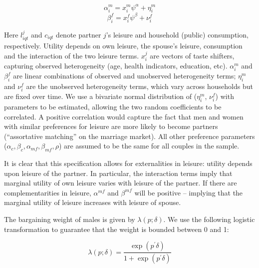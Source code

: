 \documentclass[11pt,letter]{article}
\begin{document}
\begin{equation}\label{mutman}
\alpha_{i}^{m}=x_{i}^{m}\psi^{\alpha}+\eta_{i}^{m}
\end{equation}
\begin{equation}\label{mutwoman}
\beta_{i}^{f}=x_{i}^{f}\psi^{\beta}+\nu_{i}^{f}
\end{equation}



Here $l_{iqt}^{j}$ and $c_{iqt}$ denote partner $j$'s leisure and household (public) consumption, respectively. Utility depends on own leisure, the spouse's leisure, consumption and the interaction of the two leisure terms. $x_{i}^{j}$ are vectors of taste shifters, capturing observed heterogeneity (age, health indicators, education, etc). $\alpha_{i}^{m}$ and $\beta_{i}^{f}$ are linear combinations of observed and unobserved heterogeneity terms; $\eta_{i}^{m}$ and $\nu_{i}^{f}$ are the unobserved heterogeneity terms, which vary across households but are fixed over time. We use a bivariate normal distribution of ($\eta_{i}^{m}$, $\nu_{i}^{f}$) with parameters to be estimated, allowing the two random coefficients to be correlated. A positive correlation would capture the fact that men and women with similar preferences for leisure are more likely to become partners (``assortative matching'' on the marriage market). All other preference parameters ($\alpha_c, \beta_c, \alpha_{mf},\beta_{mf}, \rho$) are assumed to be the same for all couples in the sample.

\par It is clear that this specification allows for externalities in leisure: utility depends upon leisure of the partner. In particular, the interaction terms imply that marginal utility of own leisure varies with leisure of the partner. If there are complementarities in leisure, $\alpha^{mf}$ and $\beta^{mf}$ will be positive -- implying that the marginal utility of leisure increases with leisure of spouse.

\par The bargaining weight of males is given by $\lambda(p;\delta)$. We use the following logistic transformation to guarantee that the weight is bounded between 0 and 1:

\begin{equation}\label{barg}
\lambda(p;\delta)=\frac{\exp(p^\prime \delta)}{1+\exp(p^\prime \delta)}
\end{equation}
\end{document}
